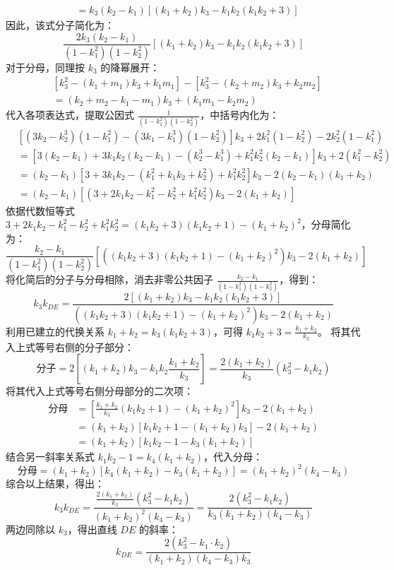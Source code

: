 \begin{solution}
\begin{align*}
&= k_3 (k_2 - k_1) \left[ (k_1 + k_2)k_3 - k_1 k_2 (k_1 k_2 + 3) \right]
\end{align*}
因此，该式分子简化为：
\[ \frac{2 k_3 (k_2 - k_1)}{(1 - k_1^2)(1 - k_2^2)} \left[ (k_1 + k_2)k_3 - k_1 k_2 (k_1 k_2 + 3) \right] \]
对于分母，同理按 $k_3$ 的降幂展开：
\begin{align*}
& \left[ k_3^2 - (k_1 + m_1)k_3 + k_1 m_1 \right] - \left[ k_3^2 - (k_2 + m_2)k_3 + k_2 m_2 \right] \\
&= (k_2 + m_2 - k_1 - m_1) k_3 + (k_1 m_1 - k_2 m_2)
\end{align*}
代入各项表达式，提取公因式 $\frac{1}{(1 - k_1^2)(1 - k_2^2)}$，中括号内化为：
\begin{align*}
& \left[ (3k_2 - k_2^3)(1 - k_1^2) - (3k_1 - k_1^3)(1 - k_2^2) \right] k_3 + 2k_1^2 (1 - k_2^2) - 2k_2^2 (1 - k_1^2) \\
&= \left[ 3(k_2 - k_1) + 3k_1 k_2 (k_2 - k_1) - (k_2^3 - k_1^3) + k_1^2 k_2^2 (k_2 - k_1) \right] k_3 + 2(k_1^2 - k_2^2) \\
&= (k_2 - k_1) \left[ 3 + 3k_1 k_2 - (k_1^2 + k_1 k_2 + k_2^2) + k_1^2 k_2^2 \right] k_3 - 2(k_2 - k_1)(k_1 + k_2) \\
&= (k_2 - k_1) \left[ \left( 3 + 2k_1 k_2 - k_1^2 - k_2^2 + k_1^2 k_2^2 \right) k_3 - 2(k_1 + k_2) \right]
\end{align*}
依据代数恒等式 $3 + 2k_1 k_2 - k_1^2 - k_2^2 + k_1^2 k_2^2 = (k_1 k_2 + 3)(k_1 k_2 + 1) - (k_1 + k_2)^2$，分母简化为：
\[ \frac{k_2 - k_1}{(1 - k_1^2)(1 - k_2^2)} \left[ \left( (k_1 k_2 + 3)(k_1 k_2 + 1) - (k_1 + k_2)^2 \right) k_3 - 2(k_1 + k_2) \right] \]
将化简后的分子与分母相除，消去非零公共因子 $\frac{k_2 - k_1}{(1 - k_1^2)(1 - k_2^2)}$，得到：
\[ k_3 k_{DE} = \frac{2 \left[ (k_1 + k_2)k_3 - k_1 k_2(k_1 k_2 + 3) \right]}{ \left( (k_1 k_2 + 3)(k_1 k_2 + 1) - (k_1 + k_2)^2 \right) k_3 - 2(k_1 + k_2) } \]
利用已建立的代换关系 $k_1+k_2 = k_3(k_1 k_2+3)$，可得 $k_1 k_2 + 3 = \frac{k_1 + k_2}{k_3}$。
将其代入上式等号右侧的分子部分：
\[ \text{分子} = 2 \left[ (k_1 + k_2)k_3 - k_1 k_2 \frac{k_1 + k_2}{k_3} \right] = \frac{2(k_1 + k_2)}{k_3} (k_3^2 - k_1 k_2) \]
将其代入上式等号右侧分母部分的二次项：
\begin{align*}
\text{分母} &= \left[ \frac{k_1 + k_2}{k_3}(k_1 k_2 + 1) - (k_1 + k_2)^2 \right] k_3 - 2(k_1 + k_2) \\
&= (k_1 + k_2) \left[ k_1 k_2 + 1 - (k_1 + k_2)k_3 \right] - 2(k_1 + k_2) \\
&= (k_1 + k_2) \left[ k_1 k_2 - 1 - k_3(k_1 + k_2) \right]
\end{align*}
结合另一斜率关系式 $k_1 k_2 - 1 = k_4(k_1 + k_2)$，代入分母：
\[ \text{分母} = (k_1 + k_2) \left[ k_4(k_1 + k_2) - k_3(k_1 + k_2) \right] = (k_1 + k_2)^2 (k_4 - k_3) \]
综合以上结果，得出：
\[ k_3 k_{DE} = \frac{\frac{2(k_1 + k_2)}{k_3} (k_3^2 - k_1 k_2)}{(k_1 + k_2)^2 (k_4 - k_3)} = \frac{2(k_3^2 - k_1 k_2)}{k_3 (k_1 + k_2) (k_4 - k_3)} \]
两边同除以 $k_3$，得出直线 $DE$ 的斜率：
\[ k_{DE} = \frac{2\left(k_3^2 - k_1 \cdot k_2\right)}{\left(k_1 + k_2\right)\left(k_4 - k_3\right)k_3} \]

\end{solution}

